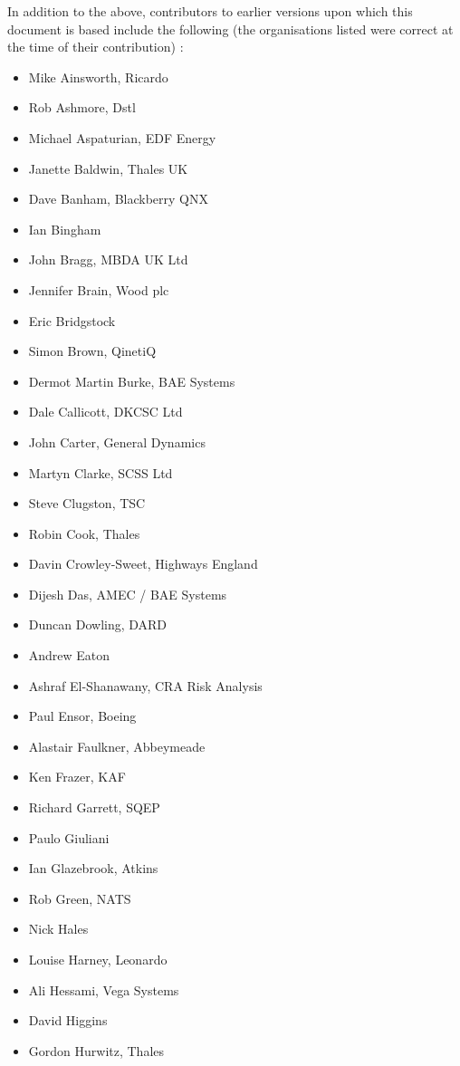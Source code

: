 In addition to the above,
contributors to earlier versions upon which this document is based include the following
(the organisations listed were correct at the time of their contribution)
:
\begin{itemize}
  \item Mike Ainsworth, Ricardo
  \item Rob Ashmore, Dstl
  \item Michael Aspaturian, EDF Energy
  \item Janette Baldwin, Thales UK
  \item Dave Banham, Blackberry QNX
  \item Ian Bingham
  \item John Bragg, MBDA UK Ltd
  \item Jennifer Brain, Wood plc
  \item Eric Bridgstock
  \item Simon Brown, QinetiQ
  \item Dermot Martin Burke, BAE Systems
  \item Dale Callicott, DKCSC Ltd
  \item John Carter, General Dynamics
  \item Martyn Clarke, SCSS Ltd
  \item Steve Clugston, TSC
  \item Robin Cook, Thales
  \item Davin Crowley-Sweet, Highways England
  \item Dijesh Das, AMEC / BAE Systems
  \item Duncan Dowling, DARD
  \item Andrew Eaton
  \item Ashraf El-Shanawany, CRA Risk Analysis
  \item Paul Ensor, Boeing 
  \item Alastair Faulkner, Abbeymeade
  \item Ken Frazer, KAF
  \item Richard Garrett, SQEP
  \item Paulo Giuliani
  \item Ian Glazebrook, Atkins
  \item Rob Green, NATS
  \item Nick Hales
  \item Louise Harney, Leonardo
  \item Ali Hessami, Vega Systems
  \item David Higgins
  \item Gordon Hurwitz, Thales

\end{itemize}
